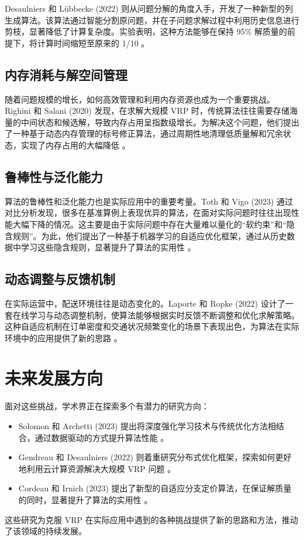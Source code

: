 \documentclass[12pt,a4paper,twoside]{ctexbook}
\begin{document}
Desaulniers 和 Lübbecke (2022) 则从问题分解的角度入手，开发了一种新型的列生成算法。该算法通过智能分割原问题，并在子问题求解过程中利用历史信息进行剪枝，显著降低了计算复杂度。实验表明，这种方法能够在保持 95\% 解质量的前提下，将计算时间缩短至原来的 1/10 \cite{19}。

\subsection{内存消耗与解空间管理}
随着问题规模的增长，如何高效管理和利用内存资源也成为一个重要挑战。Righini 和 Salani (2020) 发现，在求解大规模 VRP 时，传统算法往往需要存储海量的中间状态和候选解，导致内存占用呈指数级增长。为解决这个问题，他们提出了一种基于动态内存管理的标号修正算法，通过周期性地清理低质量解和冗余状态，实现了内存占用的大幅降低 \cite{20}。

\subsection{鲁棒性与泛化能力}
算法的鲁棒性和泛化能力也是实际应用中的重要考量。Toth 和 Vigo (2023) 通过对比分析发现，很多在基准算例上表现优异的算法，在面对实际问题时往往出现性能大幅下降的情况。这主要是由于实际问题中存在大量难以量化的“软约束”和“隐含规则”。为此，他们提出了一种基于机器学习的自适应优化框架，通过从历史数据中学习这些隐含规则，显著提升了算法的实用性 \cite{21}。

\subsection{动态调整与反馈机制}
在实际运营中，配送环境往往是动态变化的。Laporte 和 Ropke (2022) 设计了一套在线学习与动态调整机制，使算法能够根据实时反馈不断调整和优化求解策略。这种自适应机制在订单密度和交通状况频繁变化的场景下表现出色，为算法在实际环境中的应用提供了新的思路 \cite{22}。

\section{未来发展方向}
面对这些挑战，学术界正在探索多个有潜力的研究方向：
\begin{itemize}
    \item Solomon 和 Archetti (2023) 提出将深度强化学习技术与传统优化方法相结合，通过数据驱动的方式提升算法性能 \cite{23}。
    \item Gendreau 和 Desaulniers (2022) 则着重研究分布式优化框架，探索如何更好地利用云计算资源解决大规模 VRP 问题 \cite{24}。
    \item Cordeau 和 Irnich (2023) 提出了新型的自适应分支定价算法，在保证解质量的同时，显著提升了算法的实用性 \cite{25}。
\end{itemize}
这些研究为克服 VRP 在实际应用中遇到的各种挑战提供了新的思路和方法，推动了该领域的持续发展。
\end{document}
